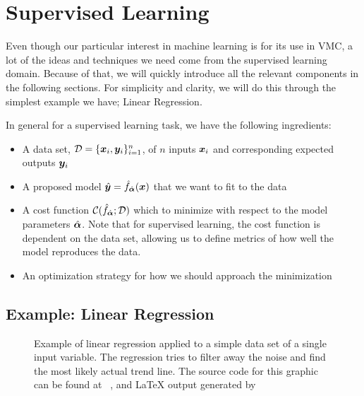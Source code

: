 \documentclass[Thesis.tex]{subfiles}
\begin{document}
\section{Supervised Learning}

Even though our particular interest in machine learning is for its use in VMC, a
lot of the ideas and techniques we need come from the supervised learning
domain. Because of that, we will quickly introduce all the relevant components in the
following sections. For simplicity and clarity, we will do this through the
simplest example we have; Linear Regression.

In general for a supervised learning task, we have the following ingredients:

\begin{itemize}
\item A data set, $\mathcal{D} = \{\bm{x}_i, \bm{y}_i\}_{i=1}^n$, of $n$ inputs $\bm{x}_i$
  and corresponding expected outputs $\bm{y}_i$
\item A proposed model $\hat{\bm{y}} = \hat f_{\hat{\bm{\alpha}}}(\bm{x})$ that we want to
    fit to the data
\item A cost function $\mathcal{C}(\hat f_{\hat{\bm{\alpha}}}; \mathcal{D})$ which
  to minimize with respect to the model parameters $\hat {\bm{\alpha}}$. Note that for
  supervised learning, the cost function is dependent on the data set, allowing
  us to define metrics of how well the model reproduces the data.
\item An optimization strategy for how we should approach the minimization
\end{itemize}


\subsection{Example: Linear Regression}

\begin{figure}[h]
  \centering
  \resizebox{\linewidth}{!}{%
      
  }
  \caption{Example of linear regression applied to a simple data set of a single
    input variable. The regression tries to filter away the noise and find the
    most likely actual trend line. The source code for this graphic can be found
    at ~\cite[TODO: Add
    path]{MS-thesis-repository}, and \LaTeX{} output generated
    by~\cite{nico_schlomer_2018_1173090}}
  \label{fig:linear-regression-example}
\end{figure}
\end{document}
